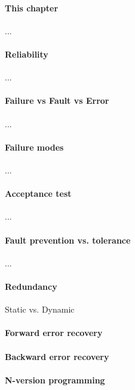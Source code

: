 
\paragraph{This chapter} ...

\sepline

\paragraph{Reliability} ...

\paragraph{Failure vs Fault vs Error} ...

\paragraph{Failure modes} ...

\paragraph{Acceptance test} ...

\paragraph{Fault prevention vs. tolerance} ...

\paragraph{Redundancy} Static vs. Dynamic

\paragraph{Forward error recovery}

\paragraph{Backward error recovery}

\paragraph{N-version programming}

